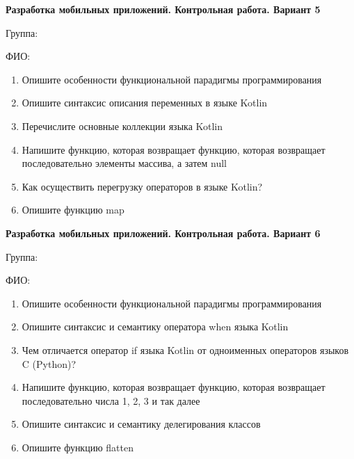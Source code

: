 \documentclass[12pt]{article}
\begin{document}
\newpage\begin{minipage}{\textwidth}
\textbf{Разработка мобильных приложений. Контрольная работа. Вариант 5}

Группа: \underline{\hspace{3cm}}

ФИО: \underline{\hspace{10cm}}

\begin{enumerate}
\item Опишите особенности функциональной парадигмы программирования
\item Опишите синтаксис описания переменных в языке Kotlin
\item Перечислите основные коллекции языка Kotlin
\item Напишите функцию, которая возвращает функцию, которая возвращает последовательно элементы массива, а затем null
\item Как осуществить перегрузку операторов в языке Kotlin?
\item Опишите функцию map

\end{enumerate}
\end{minipage}

\newpage\begin{minipage}{\textwidth}
\textbf{Разработка мобильных приложений. Контрольная работа. Вариант 6}

Группа: \underline{\hspace{3cm}}

ФИО: \underline{\hspace{10cm}}

\begin{enumerate}
\item Опишите особенности функциональной парадигмы программирования
\item Опишите синтаксис и семантику оператора when языка Kotlin
\item Чем отличается оператор if языка Kotlin от одноименных операторов языков C (Python)?
\item Напишите функцию, которая возвращает функцию, которая возвращает последовательно числа 1, 2, 3 и так далее
\item Опишите синтаксис и семантику делегирования классов
\item Опишите функцию flatten

\end{enumerate}
\end{minipage}
\end{document}
